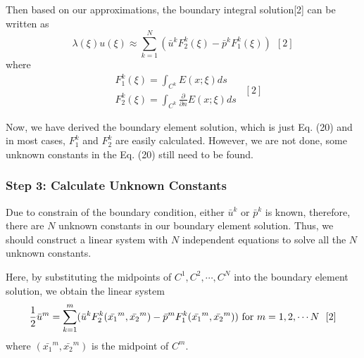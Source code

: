 \documentclass[a4paper,12pt]{article}
\begin{document}
\par Then based on our approximations, the boundary integral solution[2] can be written as
\begin{equation}
\lambda(\xi) u(\xi) \approx  \sum_{k = 1}^{N} (\bar{u}^{k} F_{2}^{k}(\xi) - \bar{p}^k F_{1}^k(\xi)) \ \ [2]
\end{equation}
where
\begin{equation}
\begin{aligned}
&F_{1}^{k}(\xi) = \int_{C^k} E(x;\xi) d s\\
&F_{2}^{k}(\xi) = \int_{C^k} \frac{\partial}{\partial n} E(x;\xi) d s
\end{aligned} \ \ [2]
\end{equation}

\par Now, we have derived the boundary element solution, which is just Eq. (20) and in most cases, $F_1^k$ and $F_2^k$ are easily calculated. However, we are not done, some unknown constants in the Eq. (20) still need to be found. 

\subsubsection*{Step 3: Calculate Unknown Constants}
Due to constrain of the boundary condition, either $\bar{u}^k$ or $\bar{p}^k$ is known, therefore, there are $N$ unknown constants in our boundary element solution. Thus, we should construct a linear system with $N$ independent equations to solve all the $N$ unknown constants. 
\par Here, by substituting the midpoints of $C^1, C^2, \cdots, C^N$ into the boundary element solution, we obtain the linear system
\begin{equation}
\frac{1}{2} \bar{u}^m = \sum_{k = 1}^m (\bar{u}^k F_2^k(\bar{x_1}^m,\bar{x_2}^m) - \bar{p}^m F_1^k(\bar{x_1}^m,\bar{x_2}^m))\  {\rm for } \ m = 1,2,\cdots N \ \ [2]
\end{equation} 
where $(\bar{x_1}^m,\bar{x_2}^m)$ is the midpoint of $C^m$. 
\end{document}
